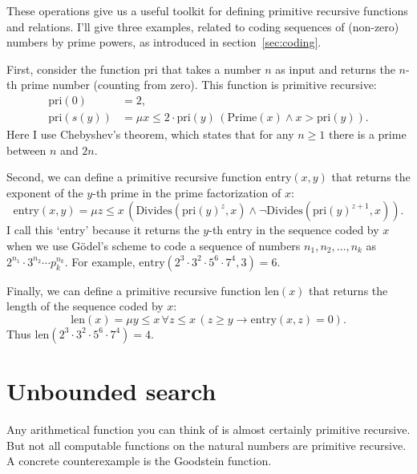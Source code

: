 These operations give us a useful toolkit for defining primitive recursive functions and relations.
I'll give three examples,
related to coding sequences of (non-zero) numbers by prime powers,
as introduced in section~\ref{sec:coding}.


First, consider
the function $\mathrm{pri}$ that takes a number $n$ as input and
returns the $n$-th prime number (counting from zero).
This function is primitive recursive:
\begin{align*}
  \mathrm{pri}(0) &= 2,\\
  \mathrm{pri}(s(y)) &= \mu x \leq 2 \cdot \mathrm{pri}(y) \,(\mathrm{Prime}(x) \land x > \mathrm{pri}(y)).
\end{align*}
Here I use Chebyshev's theorem,
which states that for any $n \geq 1$
there is a prime between $n$ and $2n$.

Second,
we can define a primitive recursive function $\mathrm{entry}(x,y)$ that
returns the exponent of the $y$-th prime in the prime factorization of $x$:
\[
  \mathrm{entry}(x,y) = \mu z \leq x \,(\text{Divides}(\mathrm{pri}(y)^{z}, x) \land \neg \text{Divides}(\mathrm{pri}(y)^{z + 1}, x)).
\]
I call this `entry' because it returns the $y$-th entry in the sequence coded by $x$
when we use Gödel's scheme to code a sequence of numbers $n_1, n_2, \ldots, n_k$ as
$2^{n_1} \cdot 3^{n_2} \cdots p_{k}^{n_k}$.
For example,
$\mathrm{entry}(2^3 \cdot 3^2 \cdot 5^6 \cdot 7^4, 3) = 6$.

Finally, we can define a primitive recursive function $\mathrm{len}(x)$ that
returns the length of the sequence coded by $x$:
\[
  \mathrm{len}(x) = \mu y \leq x \,\forall z \leq x \,(z \geq y \to \mathrm{entry}(x,z) = 0).
\]
Thus $\mathrm{len}(2^3 \cdot 3^2 \cdot 5^6 \cdot 7^4) = 4$.

\section{Unbounded search}\label{sec:minimization}

Any arithmetical function you can think of is almost certainly primitive recursive.
But not all computable functions on the natural numbers are primitive recursive.
A concrete counterexample is the Goodstein function.

